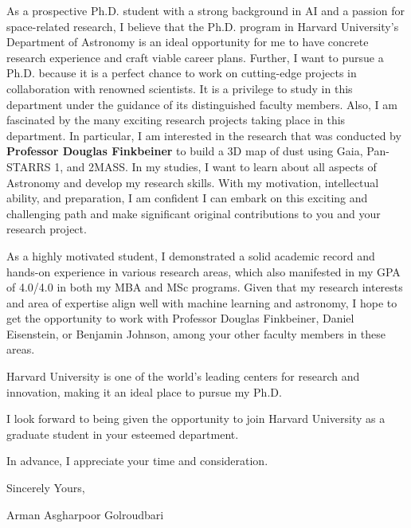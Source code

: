 \documentclass[a4,25pt]{article}
\begin{document}
\begin{large}
\vspace{-0.25cm}\quad As a prospective Ph.D. student with a strong background in AI and a passion for space-related research, I believe that the Ph.D. program in Harvard University's Department of Astronomy is an ideal opportunity for me to have concrete research experience and craft viable career plans. Further, I want to pursue a Ph.D. because it is a perfect chance to work on cutting-edge projects in collaboration with renowned scientists. It is a privilege to study in this department under the guidance of its distinguished faculty members. Also, I am fascinated by the many exciting research projects taking place in this department. In particular, I am interested in the research that was conducted by \textbf{Professor Douglas Finkbeiner} to build a 3D map of dust \cite{green20193d} using Gaia, Pan-STARRS 1, and 2MASS. In my studies, I want to learn about all aspects of Astronomy and develop my research skills. With my motivation, intellectual ability, and preparation, I am confident I can embark on this exciting and challenging path and make significant original contributions to you and your research project.\par
\vspace{-0.25cm} \quad As a highly motivated student, I demonstrated a solid academic record and hands-on experience in various research areas, which also manifested in my GPA of 4.0/4.0 in both my MBA and MSc programs. Given that my research interests and area of expertise align well with machine learning and astronomy, I hope to get the opportunity to work with Professor Douglas Finkbeiner, Daniel Eisenstein, or Benjamin Johnson, among your other faculty members in these areas. \par
\vspace{-0.25cm} \quad Harvard University is one of the world's leading centers for research and innovation, making it an ideal place to pursue my Ph.D. \par
I look forward to being given the opportunity to join Harvard University as a graduate student in your esteemed department.\par


In advance, I appreciate your time and consideration. \par
\vspace{-0.4cm} Sincerely Yours, \par
\vspace{-0.4cm}Arman Asgharpoor Golroudbari \par

\end{large}

\small

\end{document}
